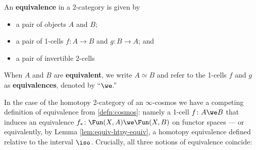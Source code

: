   \begin{definition}[equivalence]\label{defn:2-cat-equivalence} An \textbf{equivalence} in a 2-category is given by
  \begin{itemize}
  \item a pair of objects $A$ and $B$;
  \item a pair of 1-cells $f \colon A \to B$ and $g \colon B \to A$; and
  \item a pair of invertible 2-cells
  \begin{center}
  \end{center}
  \end{itemize}
  When $A$ and $B$ are \textbf{equivalent}, we write $A \simeq B$ and refer to the 1-cells $f$ and $g$ as \textbf{equivalences}, denoted by ``$\we$.''
  \end{definition}

  In the case of the homotopy 2-category of an $\infty$-cosmos we have a competing definition of equivalence from \ref{defn:cosmos}: namely a 1-cell $f \colon A \we B$ that induces an equivalence $f_* \colon \Fun(X,A) \we \Fun(X,B)$ on functor spaces --- or equivalently, by Lemma \ref{lem:equiv-htpy-equiv}, a homotopy equivalence defined relative to the interval $\iso$. Crucially, all three notions of equivalence coincide:

